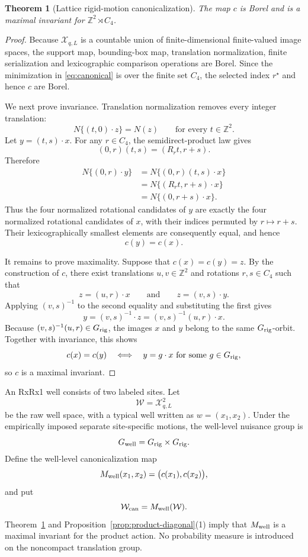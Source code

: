 \documentclass[11pt]{article}
\theoremstyle{plain}
\newtheorem{theorem}{Theorem}[section]
\theoremstyle{definition}
\numberwithin{equation}{section}
\newcommand{\Z}{\mathbb Z}
\newcommand{\1}{\mathbf 1}
\newcommand{\calX}{\mathcal X}
\newcommand{\calW}{\mathcal W}
\begin{document}
\begin{theorem}[Lattice rigid-motion canonicalization]\label{thm:lattice}
The map $c$ is Borel and is a maximal invariant for $\Z^2\rtimes C_4$.
\end{theorem}


\begin{proof}
	Because $\calX_{q,L}$ is a countable union of finite-dimensional
	finite-valued image spaces, the support map, bounding-box map,
	translation normalization, finite serialization and lexicographic
	comparison operations are Borel. Since the minimization in
	\eqref{eq:canonical} is over the finite set $C_4$, the selected index
	$r^\star$ and hence $c$ are Borel.
	
	We next prove invariance. Translation normalization removes every
	integer translation:
	\[
	N\{(t,0)\cdot z\}=N(z)
	\qquad
	\text{for every }t\in\Z^2.
	\]
	Let $y=(t,s)\cdot x$. For any $r\in C_4$, the semidirect-product law
	gives
	\[
	(0,r)(t,s)=(R_rt,r+s).
	\]
	Therefore
	\[
	\begin{aligned}
		N\{(0,r)\cdot y\}
		&=
		N\{(0,r)(t,s)\cdot x\}\\
		&=
		N\{(R_rt,r+s)\cdot x\}\\
		&=
		N\{(0,r+s)\cdot x\}.
	\end{aligned}
	\]
	Thus the four normalized rotational candidates of $y$ are exactly
	the four normalized rotational candidates of $x$, with their indices
	permuted by $r\mapsto r+s$. Their lexicographically smallest elements
	are consequently equal, and hence
	\[
	c(y)=c(x).
	\]
	
	It remains to prove maximality. Suppose that $c(x)=c(y)=z$. By the
	construction of $c$, there exist translations $u,v\in\Z^2$ and
	rotations $r,s\in C_4$ such that
	\[
	z=(u,r)\cdot x
	\qquad\text{and}\qquad
	z=(v,s)\cdot y.
	\]
	Applying $(v,s)^{-1}$ to the second equality and substituting the
	first gives
	\[
	y
	=
	(v,s)^{-1}\cdot z
	=
	(v,s)^{-1}(u,r)\cdot x.
	\]
	Because $(v,s)^{-1}(u,r)\in G_{\rm rig}$, the images $x$ and $y$
	belong to the same $G_{\rm rig}$-orbit. Together with invariance, this
	shows
	\[
	c(x)=c(y)
	\quad\Longleftrightarrow\quad
	y=g\cdot x\text{ for some }g\in G_{\rm rig},
	\]
	so $c$ is a maximal invariant.
\end{proof}

An RxRx1 well consists of two labeled sites. Let
\[
\calW=\calX_{q,L}^2
\]
be the raw well space, with a typical well written as
$w=(x_1,x_2)$. Under the empirically imposed separate site-specific
motions, the well-level nuisance group is
\[
G_{\rm well}=G_{\rm rig}\times G_{\rm rig}.
\]
Define the well-level canonicalization map
\begin{equation}\label{eq:wellcanonical}
	M_{\rm well}(x_1,x_2)
	=
	\bigl(c(x_1),c(x_2)\bigr),
\end{equation}
and put
\[
\calW_{\rm can}=M_{\rm well}(\calW).
\]
Theorem~\ref{thm:lattice} and
Proposition~\ref{prop:product-diagonal}(1) imply that
$M_{\rm well}$ is a maximal invariant for the product action. No
probability measure is introduced on the noncompact translation
group.
\end{document}
